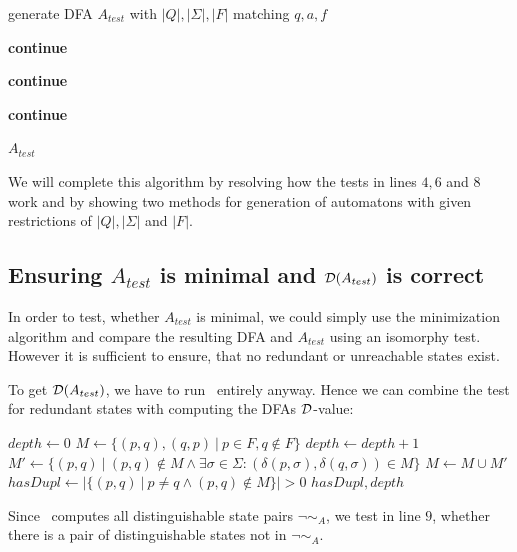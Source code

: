 
\vspace{0.2cm}
\begin{algorithmic}[1]
		
			\vspace{0.2cm}
		
			\State generate DFA $A_{test}$ with $|Q|, |\Sigma|, |F|$ matching $q, a, f$
			
			\vspace{0.2cm}
			
				\State \textbf{continue}
			\EndIf
			
				\State \textbf{continue}
			\EndIf
			
				\State \textbf{continue}
			\EndIf
			
			\vspace{0.2cm}
			
			\State\Return $A_{test}$
		\EndWhile
	\EndFunction
\end{algorithmic}
\vspace{0.2cm}
We will complete this algorithm by resolving how the tests in lines $4, 6$ and $8$ work and by showing two methods for generation of automatons with given restrictions of $|Q|, |\Sigma|$ and $|F|$.

\subsection{Ensuring $A_{test}$ is minimal and $\mathcal{D}(A_{test})$ is correct}

In order to test, whether $A_{test}$ is minimal, we could simply use the minimization algorithm and compare the resulting DFA and $A_{test}$ using an isomorphy test. However it is sufficient to ensure, that no redundant or unreachable states exist.

To get $\mathcal{D}(A_{test})$, we have to run \CompDist\ entirely anyway. Hence we can combine the test for redundant states with computing the DFAs $\mathcal{D}$-value:
\vspace{0.2cm}
\begin{algorithmic}[1]
		\State $depth \gets 0$
		\State $M \gets \{ (p,q), (q,p)\ |\ p \in F, q \notin F \}$
		\Do
			\State $depth \gets depth + 1$
			\State $M' \gets \{ (p,q)\ |\ (p,q) \notin M \land \exists \sigma \in \Sigma \colon (\delta(p,\sigma), \delta(q,\sigma)) \in M \}$
			\State $M \gets M \cup M'$
		\State $hasDupl \gets | \{ (p,q)\ |\ p \neq q \land (p,q) \notin M \} | > 0$
		\State \Return $hasDupl, depth$
	\EndFunction
\end{algorithmic}
\vspace{0.2cm}
Since \CompDist\ computes all distinguishable state pairs $\neg \sim_A$, we test in line $9$, whether there is a pair of distinguishable states not in $\neg \sim_A$.


